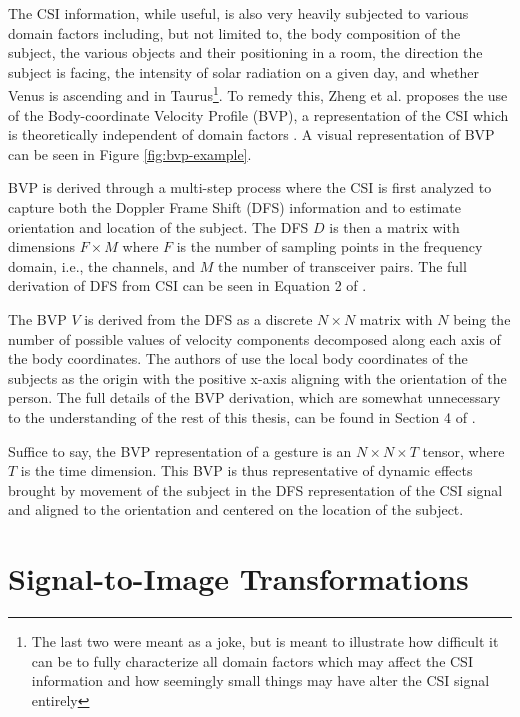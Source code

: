 The CSI information, while useful, is also very heavily subjected to various domain factors including, but not limited to, the body composition of the subject, the various objects and their positioning in a room, the direction the subject is facing, the intensity of solar radiation on a given day, and whether Venus is ascending and in Taurus\footnote{The last two were meant as a joke, but is meant to illustrate how difficult it can be to fully characterize all domain factors which may affect the CSI information and how seemingly small things may have alter the CSI signal entirely}.
To remedy this, Zheng et al. \cite{zheng2019zero} proposes the use of the Body-coordinate Velocity Profile (BVP), a representation of the CSI which is theoretically independent of domain factors \cite{zheng2019zero}.
A visual representation of BVP can be seen in Figure \ref{fig:bvp-example}.

BVP is derived through a multi-step process where the CSI is first analyzed to capture both the Doppler Frame Shift (DFS) information and to estimate orientation and location of the subject.
The DFS $D$ is then a matrix with dimensions $F \times M$ where $F$ is the number of sampling points in the frequency domain, i.e., the channels, and $M$ the number of transceiver pairs.
The full derivation of DFS from CSI can be seen in Equation 2 of \cite{zheng2019zero}.

The BVP $V$ is derived from the DFS as a discrete $N \times N$ matrix with $N$ being the number of possible values of velocity components decomposed along each axis of the body coordinates.
The authors of \cite{zheng2019zero} use the local body coordinates of the subjects as the origin with the positive x-axis aligning with the orientation of the person.
The full details of the BVP derivation, which are somewhat unnecessary to the understanding of the rest of this thesis, can be found in Section 4 of \cite{zheng2019zero}.

Suffice to say, the BVP representation of a gesture is an $N \times N \times T$ tensor, where $T$ is the time dimension.
This BVP is thus representative of dynamic effects brought by movement of the subject in the DFS representation of the CSI signal and aligned to the orientation and centered on the location of the subject.

\section{Signal-to-Image Transformations}\label{sec:background-signal-to-image}

